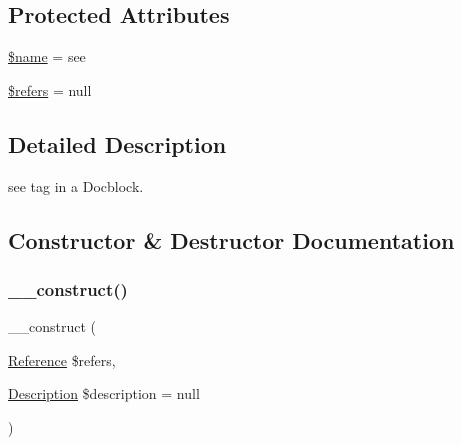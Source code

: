\subsection*{Protected Attributes}
\begin{DoxyCompactItemize}
\item 
\mbox{\hyperlink{classphp_documentor_1_1_reflection_1_1_doc_block_1_1_tags_1_1_see_ab2fc40d43824ea3e1ce5d86dee0d763b}{\$name}} = \textquotesingle{}see\textquotesingle{}
\item 
\mbox{\hyperlink{classphp_documentor_1_1_reflection_1_1_doc_block_1_1_tags_1_1_see_a7d314abc99768996ac1e3dad789818f6}{\$refers}} = null
\end{DoxyCompactItemize}


\subsection{Detailed Description}
see tag in a Docblock. 

\subsection{Constructor \& Destructor Documentation}
\mbox{\label{classphp_documentor_1_1_reflection_1_1_doc_block_1_1_tags_1_1_see_aba0c573d8d874e5345c111c6ab60f925}} 
\subsubsection{\texorpdfstring{\+\_\+\+\_\+construct()}{\_\_construct()}}
{\footnotesize\ttfamily \+\_\+\+\_\+construct (\begin{DoxyParamCaption}\item[{\mbox{\hyperlink{interfacephp_documentor_1_1_reflection_1_1_doc_block_1_1_tags_1_1_reference_1_1_reference}{Reference}}}]{\$refers,  }\item[{\mbox{\hyperlink{classphp_documentor_1_1_reflection_1_1_doc_block_1_1_description}{Description}}}]{\$description = {\ttfamily null} }\end{DoxyParamCaption})}

